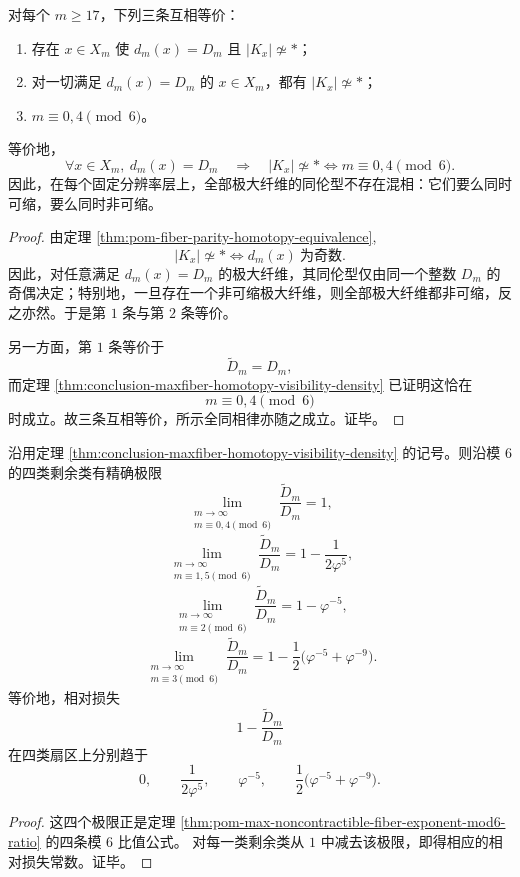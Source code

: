 \begin{theorem}\label{thm:conclusion-maxfiber-uniphase-mod6-law}
对每个 \(m\ge 17\)，下列三条互相等价：
\begin{enumerate}
  \item 存在 \(x\in X_m\) 使 \(d_m(x)=D_m\) 且 \(|K_x|\not\simeq *\)；
  \item 对一切满足 \(d_m(x)=D_m\) 的 \(x\in X_m\)，都有 \(|K_x|\not\simeq *\)；
  \item \(m\equiv 0,4\pmod 6\)。
\end{enumerate}
等价地，
\[
\boxed{\;
\forall x\in X_m,\ d_m(x)=D_m
\quad\Longrightarrow\quad
|K_x|\not\simeq *
\iff
m\equiv 0,4\pmod 6.\;}
\]
因此，在每个固定分辨率层上，全部极大纤维的同伦型不存在混相：它们要么同时可缩，要么同时非可缩。
\end{theorem}
\begin{proof}
由定理 \ref{thm:pom-fiber-parity-homotopy-equivalence},
\[
|K_x|\not\simeq *
\iff
d_m(x)\ \text{为奇数}.
\]
因此，对任意满足 \(d_m(x)=D_m\) 的极大纤维，其同伦型仅由同一个整数 \(D_m\) 的奇偶决定；特别地，一旦存在一个非可缩极大纤维，则全部极大纤维都非可缩，反之亦然。于是第 \(1\) 条与第 \(2\) 条等价。

另一方面，第 \(1\) 条等价于
\[
\widetilde D_m=D_m,
\]
而定理 \ref{thm:conclusion-maxfiber-homotopy-visibility-density} 已证明这恰在
\[
m\equiv 0,4\pmod 6
\]
时成立。故三条互相等价，所示全同相律亦随之成立。证毕。
\end{proof}

\begin{theorem}\label{thm:conclusion-max-noncontractible-fiber-mod6-golden-ratios}
沿用定理 \ref{thm:conclusion-maxfiber-homotopy-visibility-density} 的记号。则沿模 \(6\) 的四类剩余类有精确极限
\[
\boxed{\;
\lim_{\substack{m\to\infty\\ m\equiv 0,4\!\!\!\!\pmod 6}}
\frac{\widetilde D_m}{D_m}=1,\;}
\]
\[
\boxed{\;
\lim_{\substack{m\to\infty\\ m\equiv 1,5\!\!\!\!\pmod 6}}
\frac{\widetilde D_m}{D_m}
=
1-\frac{1}{2\varphi^{5}},\;}
\]
\[
\boxed{\;
\lim_{\substack{m\to\infty\\ m\equiv 2\!\!\!\!\pmod 6}}
\frac{\widetilde D_m}{D_m}
=
1-\varphi^{-5},\;}
\]
\[
\boxed{\;
\lim_{\substack{m\to\infty\\ m\equiv 3\!\!\!\!\pmod 6}}
\frac{\widetilde D_m}{D_m}
=
1-\frac12\bigl(\varphi^{-5}+\varphi^{-9}\bigr).\;}
\]
等价地，相对损失
\[
1-\frac{\widetilde D_m}{D_m}
\]
在四类扇区上分别趋于
\[
0,\qquad
\frac{1}{2\varphi^5},\qquad
\varphi^{-5},\qquad
\frac12\bigl(\varphi^{-5}+\varphi^{-9}\bigr).
\]
\end{theorem}
\begin{proof}
这四个极限正是定理 \ref{thm:pom-max-noncontractible-fiber-exponent-mod6-ratio} 的四条模 \(6\) 比值公式。
对每一类剩余类从 \(1\) 中减去该极限，即得相应的相对损失常数。证毕。
\end{proof}


